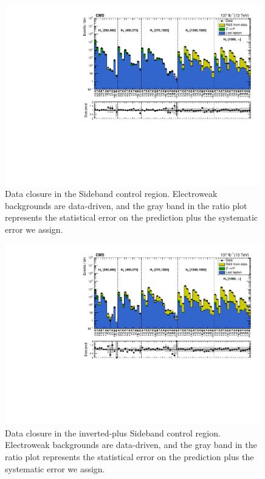 \begin{figure}[htbp]
  \begin{center}
    \includegraphics[width=0.99\textwidth]{figs/qcd/rs_data/comp_MT2SideBand.pdf}
    \caption{Data closure in the \mttwo Sideband control region. Electroweak backgrounds are data-driven, and the gray band in the ratio plot represents the statistical error on the prediction plus the systematic error we assign.}
    \label{Fig:rs_dataCR_MT2SideBand}
  \end{center}
\end{figure}

\begin{figure}[htbp]
  \begin{center}
    \includegraphics[width=0.99\textwidth]{figs/qcd/rs_data/comp_DPhiMT2.pdf}
    \caption{Data closure in the inverted-\dphimet plus \mttwo Sideband control region. Electroweak backgrounds are data-driven, and the gray band in the ratio plot represents the statistical error on the prediction plus the systematic error we assign.}
    \label{Fig:rs_dataCR_DPhiMT2}
  \end{center}
\end{figure}

